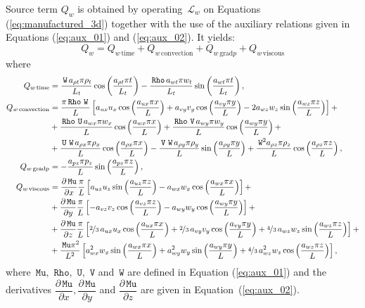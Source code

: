 \documentclass[10pt]{article}
\newcommand{\diff}[2] {\dfrac{\partial #1}{\partial #2}}
\newcommand{\Rho}{\,\mathtt{Rho}}
\newcommand{\U}{\,\mathtt{U}}
\newcommand{\V}{\,\mathtt{V}}
\newcommand{\W}{\,\mathtt{W}}
\newcommand{\Lo}{\,\mathcal{L}}
\newcommand{\Mu}{\,\mathtt{Mu}}
\newcommand{\DMuDx}{\diff{\Mu}{x}}
\newcommand{\DMuDy}{\diff{\Mu}{y}}
\newcommand{\DMuDz}{\diff{\Mu}{z}}
\newcommand{\convection}{\text{convection}}
\newcommand{\gradp}{\text{grad}p}
\newcommand{\viscous}{\text{viscous}}
\begin{document}
Source term $Q_w $ is obtained by operating $\Lo_{w }$ on Equations  (\ref{eq:manufactured_3d}) together with the use of the  auxiliary relations given in Equations (\ref{eq:aux_01}) and (\ref{eq:aux_02}). It yields:
\begin{equation*}
Q_w  = Q_{w  \, \text{time}}+Q_{w  \, \convection}+Q_{w  \, \gradp }+Q_{w  \, \viscous }
\end{equation*}
where
\begin{equation*}
 \begin{split}
 Q_{w \, \text{time}}&= 
\frac{\W \, a_{\rho t} \pi  \rho_{t} }{L_t}\cos\left(\frac{a_{\rho t} \pi t}{L_t}\right) - \frac{\Rho \, a_{wt} \pi w_{t} }{L_t}\sin\left(\frac{a_{wt} \pi t}{L_t}\right),\\
%
 Q_{w \, \text{convection}}&= 
\frac{\pi \Rho \, \W \, }{L}\left[a_{ux} u_{x} \cos\left(\frac{a_{ux} \pi x}{L}\right) + a_{vy} v_{y} \cos\left(\frac{a_{vy} \pi y}{L}\right) - 2 a_{wz} w_{z} \sin\left(\frac{a_{wz} \pi z}{L}\right)\right] + \\ 
&+ \frac{\Rho \, \U \, a_{wx} \pi w_{x} }{L} \cos\left(\frac{a_{wx} \pi x}{L}\right)+ \frac{\Rho \, \V \, a_{wy} \pi w_{y} }{L}\cos\left(\frac{a_{wy} \pi y}{L}\right) + \\ 
&+ \frac{\U \, \W \, a_{\rho x} \pi \rho_{x} }{L}\cos\left(\frac{a_{\rho x} \pi x}{L}\right) - \frac{\V \, \W \, a_{\rho y} \pi \rho_{y} }{L}\sin\left(\frac{a_{\rho y} \pi y}{L}\right)+ \frac{\W^{2} a_{\rho z} \pi \rho_{z} }{L}\cos\left(\frac{a_{\rho z} \pi z}{L}\right) ,\\
%
 Q_{w \, \text{gradp}}&= - \frac{a_{pz} \pi p_{z} }{L}\sin\left(\frac{a_{pz} \pi z}{L}\right),\\
%
 Q_{w \, \text{viscous}}&= 
\DMuDx\frac{\pi }{L} \left[a_{uz} u_{z} \sin\left(\frac{a_{uz} \pi z}{L}\right) - a_{wx} w_{x} \cos\left(\frac{a_{wx} \pi x}{L}\right)\right] + \\
&+ \DMuDy\frac{\pi }{L} \left[- a_{vz} v_{z} \cos\left(\frac{a_{vz} \pi z}{L}\right) - a_{wy} w_{y} \cos\left(\frac{a_{wy} \pi y}{L}\right)\right] + \\ 
&+ \DMuDz\frac{\pi }{L} \left[\nicefrac{2}{3} \, a_{ux} u_{x} \cos\left(\frac{a_{ux} \pi x}{L}\right) + \nicefrac{2}{3} \, a_{vy} v_{y} \cos\left(\frac{a_{vy} \pi y}{L}\right) + \nicefrac{4}{3} \, a_{wz} w_{z} \sin\left(\frac{a_{wz} \pi z}{L}\right)\right] + \\ 
&+ \frac{\Mu \pi^{2} }{L^2} \left[a_{wx}^{2} w_{x} \sin\left(\frac{a_{wx} \pi x}{L}\right) + a_{wy}^{2} w_{y} \sin\left(\frac{a_{wy} \pi y}{L}\right) + \nicefrac{4}{3} \, a_{wz}^{2} w_{z} \cos\left(\frac{a_{wz} \pi z}{L}\right)\right],
 \end{split}
\end{equation*}
where $\Mu,\, \Rho,\,\U,\,\V$ and $\W$ are defined in Equation (\ref{eq:aux_01}) and the derivatives $\DMuDx,\DMuDy$ and $\DMuDz$ are given in Equation~(\ref{eq:aux_02}).
\end{document}
